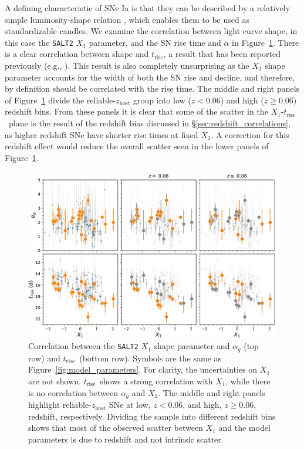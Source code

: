 \documentclass[twocolumn]{./aastex63}
\newcommand{\trise}{$t_\mathrm{rise}$}
\begin{document}
A defining characteristic of SNe Ia is that they can be described by a
relatively simple luminosity-shape relation \citep{Phillips93}, which enables
them to be used as standardizable candles. We examine the correlation between
light curve shape, in this case the \texttt{SALT2} $X_1$ parameter, and the SN
rise time and $\alpha$ in Figure~\ref{fig:shape_correlations}. There is a clear
correlation between shape and \trise, a result that has been reported previously
(e.g., \citealt{Riess99a,Firth15,Zheng17a}). This result is also completely
unsurprising as the $X_1$ shape parameter accounts for the width of both the SN
rise and decline, and therefore, by definition should be correlated with the
rise time. The middle and right panels of Figure~\ref{fig:shape_correlations}
divide the reliable-$z_\mathrm{host}$ group into low ($z < 0.06$) and high ($z
\ge 0.06$) redshift bins. From these panels it is clear that some of the scatter
in the $X_1$-\trise\ plane is the result of the redshift bias discussed in
\S\ref{sec:redshift_correlations}, as higher redshift SNe have shorter rise
times at fixed $X_1$. A correction for this redshift effect would reduce the
overall scatter seen in the lower panels of Figure~\ref{fig:shape_correlations}.

\begin{figure}
    \centering
    \includegraphics[width=6in]{./figures/shape_correlations.pdf}
    \caption{Correlation between the \texttt{SALT2} $X_1$ shape parameter and
    $\alpha_g$ (top row) and \trise\ (bottom row). Symbols are the same as
    Figure~\ref{fig:model_parameters}. For clarity, the uncertainties on $X_1$
    are not shown. \trise\ shows a strong correlation with $X_1$, while there is
    no correlation between $\alpha_g$ and $X_1$. The middle and right panels
    highlight reliable-$z_\mathrm{host}$ SNe at low, $z < 0.06$, and high, $z
    \ge 0.06$, redshift, respectively. Dividing the sample into different
    redshift bins shows that most of the observed scatter between $X_1$ and the
    model parameters is due to redshift and not intrinsic scatter. }
    \label{fig:shape_correlations}
\end{figure}
\end{document}
